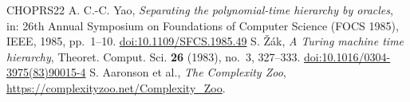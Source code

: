 \documentclass[11pt,reqno]{amsart}
\numberwithin{equation}{section}
\theoremstyle{plain}
\theoremstyle{definition}
\theoremstyle{remark}
\begin{document}
\begin{thebibliography}{CHOPRS22}
 A. C.-C. Yao, \emph{Separating the polynomial-time hierarchy by oracles}, in: 26th Annual Symposium on Foundations of Computer Science (FOCS 1985), IEEE, 1985, pp.~1--10. \href{https://doi.org/10.1109/SFCS.1985.49}{doi:10.1109/SFCS.1985.49}
 S. {\v Z}{\'a}k, \emph{A Turing machine time hierarchy}, Theoret. Comput. Sci. \textbf{26} (1983), no.~3, 327--333. \href{https://doi.org/10.1016/0304-3975(83)90015-4}{doi:10.1016/0304-3975(83)90015-4}
 S. Aaronson et al., \emph{The Complexity Zoo}, \url{https://complexityzoo.net/Complexity_Zoo}.
\end{thebibliography}
\endgroup
\end{document}
